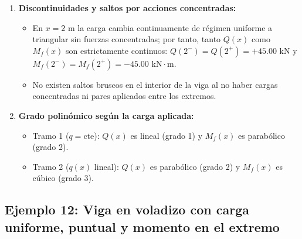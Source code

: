 {\begin{enumerate}
\begin{itemize}
                  \item Extremo libre $C$ ($x = 5\text{ m}$): Al no haber fuerzas ni momentos puntuales exteriores en la punta, el cortante y el momento flector se anulan rigurosamente: $Q(5) = 0$ y $M_f(5) = 0$.

              \end{itemize}



        \item \textbf{Discontinuidades y saltos por acciones concentradas:}

              \begin{itemize}

                  \item En $x = 2\text{ m}$ la carga cambia continuamente de régimen uniforme a triangular sin fuerzas concentradas; por tanto, tanto $Q(x)$ como $M_f(x)$ son estrictamente continuos: $Q(2^-) = Q(2^+) = +45.00\text{ kN}$ y $M_f(2^-) = M_f(2^+) = -45.00\text{ kN}\cdot\text{m}$.

                  \item No existen saltos bruscos en el interior de la viga al no haber cargas concentradas ni pares aplicados entre los extremos.

              \end{itemize}



        \item \textbf{Grado polinómico según la carga aplicada:}

              \begin{itemize}

                  \item Tramo 1 ($q = \text{cte}$): $Q(x)$ es lineal (grado 1) y $M_f(x)$ es parabólico (grado 2).

                  \item Tramo 2 ($q(x)$ lineal): $Q(x)$ es parabólico (grado 2) y $M_f(x)$ es cúbico (grado 3).

              \end{itemize}

    \end{enumerate}

}



\subsection{Ejemplo 12: Viga en voladizo con carga uniforme, puntual y momento en el extremo}



